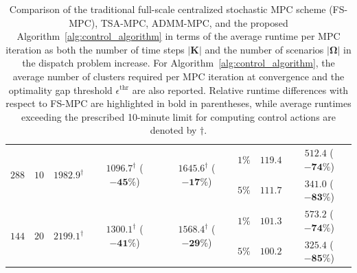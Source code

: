 \documentclass[a4paper,fleqn]{cas-sc}
\begin{document}
\begin{table}
\begin{tabular}{cccccccc}
\multirow{2}{*}{$288$}
& \multirow{2}{*}{$10$}
& \multirow{2}{*}{$1982.9^{\dagger}$}
& \multirow{2}{*}{$1096.7^{\dagger}$ ($\boldsymbol{-45\%}$)}
& \multirow{2}{*}{$1645.6^{\dagger}$ ($\boldsymbol{-17\%}$)}
& $1\%$
& $119.4$
& $512.4$ ($\boldsymbol{-74\%}$) \\
& & & &
& $5\%$
& $111.7$
& $341.0$ ($\boldsymbol{-83\%}$) \\

\multirow{2}{*}{$144$}
& \multirow{2}{*}{$20$}
& \multirow{2}{*}{$2199.1^{\dagger}$}
& \multirow{2}{*}{$1300.1^{\dagger}$ ($\boldsymbol{-41\%}$)}
& \multirow{2}{*}{$1568.4^{\dagger}$ ($\boldsymbol{-29\%}$)}
& $1\%$
& $101.3$
& $573.2$ ($\boldsymbol{-74\%}$) \\
& & & &
& $5\%$
& $100.2$
& $325.4$ ($\boldsymbol{-85\%}$) \\

\hline
\end{tabular}
\caption{
Comparison of the traditional full-scale centralized stochastic MPC scheme (FS-MPC), TSA-MPC, ADMM-MPC, and the proposed Algorithm~\ref{alg:control_algorithm}
in terms of the average runtime per MPC iteration
as both the number of time steps $|\boldsymbol{K}|$ and the number of scenarios $|\boldsymbol{\Omega}|$ in the dispatch problem increase.
For Algorithm~\ref{alg:control_algorithm}, the average number of clusters required per MPC iteration at convergence and the optimality gap threshold $\epsilon^{\mathrm{thr}}$ are also reported.
Relative runtime differences with respect to FS-MPC are highlighted in bold in parentheses,
while average runtimes exceeding the prescribed 10-minute limit for computing control actions are denoted by $\dagger$.
}
\label{tab:comp_res}
\end{table}
\end{document}
